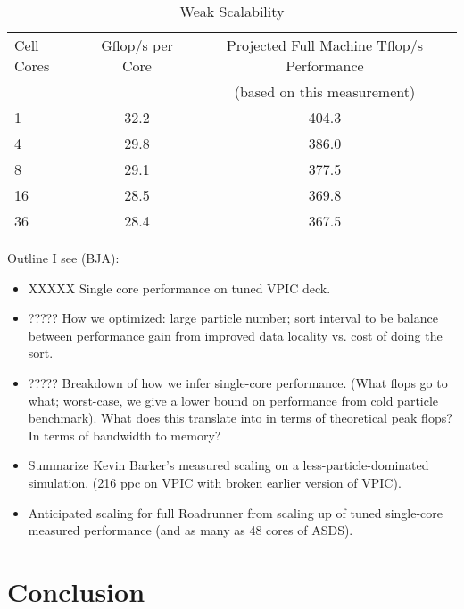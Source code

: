 \documentclass[letter,10pt]{article}
\begin{document}
\begin{table}
\caption{\label{tbl:ASDS_Weak_Scalability}
Weak Scalability}

\begin{center}
\begin{tabular}{l c c}
\hline
\hline
Cell Cores & Gflop/s per Core & Projected Full Machine Tflop/s Performance \\
 & & (based on this measurement) \\
\hline
1 & 32.2 & 404.3 \\
4 & 29.8 & 386.0 \\
8 & 29.1 & 377.5 \\
16 & 28.5 & 369.8 \\
36 & 28.4 & 367.5 \\
\hline
\end{tabular}
\end{center}
\end{table}

Outline I see (BJA):  
\begin{itemize}
\item XXXXX Single core performance on tuned VPIC deck.

\item ????? How we optimized:  large particle number; sort interval to be 
balance between performance gain from improved data locality vs. 
cost of doing the sort. 

\item ????? Breakdown of how we infer single-core performance.  (What flops go to 
what; worst-case, we give a lower bound on performance from cold particle
benchmark).  What does this translate into in terms of theoretical peak 
flops?  In terms of bandwidth to memory? 

\item Summarize Kevin Barker's measured scaling on a less-particle-dominated 
simulation.  (216 ppc on VPIC with broken earlier version of VPIC). 

\item Anticipated scaling for full Roadrunner from scaling up of tuned 
single-core measured performance (and as many as 48 cores of ASDS).  

\end{itemize}

\section*{Conclusion}

\begin{singlespace}


\end{singlespace}

\end{document}
